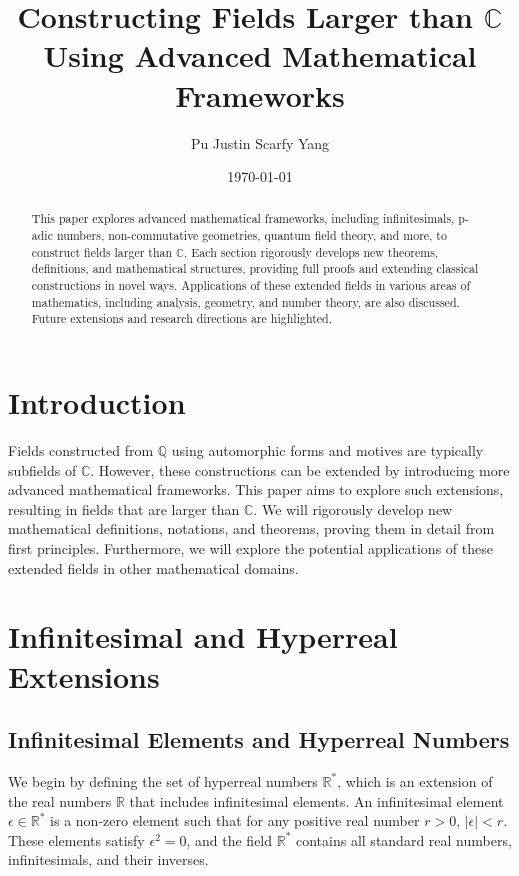 \documentclass{article}
\title{Constructing Fields Larger than \(\mathbb{C}\) Using Advanced Mathematical Frameworks}
\author{Pu Justin Scarfy Yang}
\date{\today}
\begin{document}
\maketitle


\begin{abstract}
This paper explores advanced mathematical frameworks, including infinitesimals, p-adic numbers, non-commutative geometries, quantum field theory, and more, to construct fields larger than \(\mathbb{C}\). Each section rigorously develops new theorems, definitions, and mathematical structures, providing full proofs and extending classical constructions in novel ways. Applications of these extended fields in various areas of mathematics, including analysis, geometry, and number theory, are also discussed. Future extensions and research directions are highlighted.
\end{abstract}

\tableofcontents


\section{Introduction}
Fields constructed from \(\mathbb{Q}\) using automorphic forms and motives are typically subfields of \(\mathbb{C}\). However, these constructions can be extended by introducing more advanced mathematical frameworks. This paper aims to explore such extensions, resulting in fields that are larger than \(\mathbb{C}\). We will rigorously develop new mathematical definitions, notations, and theorems, proving them in detail from first principles. Furthermore, we will explore the potential applications of these extended fields in other mathematical domains.

\section{Infinitesimal and Hyperreal Extensions}
\subsection{Infinitesimal Elements and Hyperreal Numbers}
We begin by defining the set of hyperreal numbers \(\mathbb{R}^*\), which is an extension of the real numbers \(\mathbb{R}\) that includes infinitesimal elements. An infinitesimal element \(\epsilon \in \mathbb{R}^*\) is a non-zero element such that for any positive real number \(r > 0\), \(|\epsilon| < r\). These elements satisfy \(\epsilon^2 = 0\), and the field \(\mathbb{R}^*\) contains all standard real numbers, infinitesimals, and their inverses.
\end{document}
